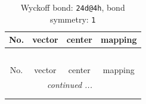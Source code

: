 \documentclass[fleqn,8pt]{jsarticle}
\begin{document}
\renewcommand{\arraystretch}{1.2}
\begin{longtable}{cccc}
\caption{Wyckoff bond: {\tt 24d@4h}, bond symmetry: {\tt 1}}
 \\
 \hline \hline
No. & vector & center & mapping \\ \hline \endfirsthead

\multicolumn{3}{l}{\tablename\ \thetable{}} \\
 \hline \hline
No. & vector & center & mapping \\ \hline \endhead

 \hline \hline
\multicolumn{3}{r}{\footnotesize\it continued ...} \\ \endfoot

 \hline \hline
\multicolumn{3}{r}{} \\ \endlastfoot


\end{longtable}
\end{document}

